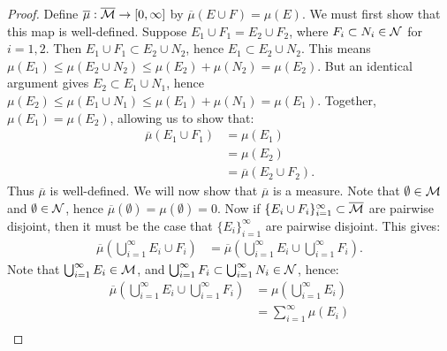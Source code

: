 \begin{proof}
            Define $\overline{\mu}:\overline{\mathcal{M}} \rightarrow [0,\infty]$ by $\overline{\mu}(E \cup F) = \mu(E)$. We must first show that this map is well-defined. Suppose $E_1 \cup F_1 = E_2 \cup F_2$, where $F_i \subset N_i \in \mathcal{N}$ for $i=1,2$. Then $E_1 \cup F_1 \subset E_2 \cup N_2$, hence $E_1 \subset E_2 \cup N_2$. This means $\mu(E_1) \leq \mu(E_2 \cup N_2) \leq \mu(E_2) + \mu(N_2) = \mu(E_2)$. But an identical argument gives $E_2 \subset E_1 \cup N_1$, hence $\mu(E_2) \leq \mu(E_1 \cup N_1) \leq \mu(E_1) + \mu(N_1) = \mu(E_1)$. Together, $\mu(E_1) = \mu(E_2)$, allowing us to show that:
                \begin{equation*}
                \begin{split}
                    \overline{\mu}(E_1 \cup F_1)
                    & = \mu(E_1) \\
                    & = \mu(E_2) \\
                    & = \overline{\mu}(E_2 \cup F_2).
                \end{split}
                \end{equation*}
            Thus $\overline{\mu}$ is well-defined. We will now show that $\overline{\mu}$ is a measure. Note that $\emptyset \in \mathcal{M}$ and $\emptyset \in \mathcal{N}$, hence $\overline{\mu}(\emptyset) = \mu(\emptyset) = 0$. Now if $\{E_i \cup F_i\}_{i = 1}^\infty \subset \overline{\mathcal{M}}$ are pairwise disjoint, then it must be the case that $\{E_i\}_{i = 1}^\infty$ are pairwise disjoint. This gives:
                \begin{equation*}
                \begin{split}
                    \overline{\mu}\left(\bigcup_{i = 1}^\infty E_i \cup F_i\right) 
                    & = \overline{\mu} \left( \bigcup_{i = 1}^\infty E_i \cup \bigcup_{i = 1}^\infty F_i \right).
                \end{split}
                \end{equation*}
            Note that $\bigcup_{i = 1}^\infty E_i \in \mathcal{M}$, and $\bigcup_{i = 1}^\infty F_i \subset \bigcup_{i = 1}^\infty N_i \in \mathcal{N}$, hence:
                \begin{equation*}
                \begin{split}
                    \overline{\mu} \left( \bigcup_{i = 1}^\infty E_i \cup \bigcup_{i = 1}^\infty F_i \right) 
                    & = \mu\left(\bigcup_{i = 1}^\infty E_i\right) \\
                    & = \sum_{i = 1}^\infty \mu(E_i) \\

\end{split}
\end{equation*}
\end{proof}
